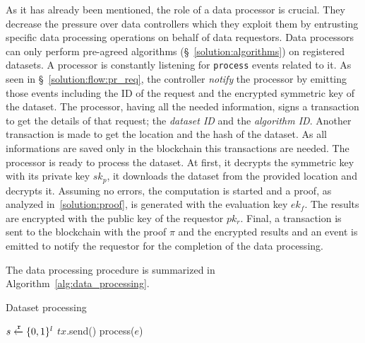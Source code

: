 As it has already been mentioned, the role of a data processor is crucial. They decrease the pressure over data controllers which they exploit them by entrusting specific data processing operations on behalf of data requestors. Data processors can only perform pre-agreed algorithms (§~\ref{solution:algorithms}) on registered datasets. A processor is constantly listening for \verb|process| events related to it. As seen in §~\ref{solution:flow:pr_req}, the controller \textit{notify} the processor by emitting those events including the ID of the request and the encrypted symmetric key of the dataset. The processor, having all the needed information, signs a transaction to get the details of that request; the \textit{dataset ID} and the \textit{algorithm ID}. Another transaction is made to get the location and the hash of the dataset. As all informations are saved only in the blockchain this transactions are needed. The processor is ready to process the dataset. At first, it decrypts the symmetric key with its private key $sk_p$, it downloads the dataset from the provided location and decrypts it. Assuming no errors, the computation is started and a proof, as analyzed in~\ref{solution:proof}, is generated with the evaluation key $ek_f$. The results are encrypted with the public key of the requestor $pk_r$. Final, a transaction is sent to the blockchain with the proof $\pi$ and the encrypted results and an event is emitted to notify the requestor for the completion of the data processing.

The data processing procedure is summarized in Algorithm~\ref{alg:data_processing}.

\begin{algorithm}[!htb]
  \caption{Dataset processing}\label{alg:data_processing}
  \begin{algorithmic}[1]
     
     
     
     
     
    \State $s \xleftarrow{\mathtt{r}}{\{0, 1\}^{l}}$ 
     
     
     
     
    \State $tx$.send()
  \EndProcedure
     
      \State process($e$) 
    \EndWhile
  \EndProcedure
  \end{algorithmic}
\end{algorithm}


